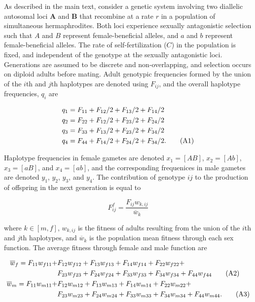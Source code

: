 \documentclass{article}
\newcommand\numberthis{\addtocounter{equation}{1}\tag{\theequation}}
\begin{document}
As described in the main text, consider a genetic system involving two diallelic autosomal loci $\mathbf{A}$ and $\mathbf{B}$ that recombine at a rate $r$ in a population of simultaneous hermaphrodites. Both loci experience sexually antagonistic selection such that $A$ and $B$ represent female-beneficial alleles, and $a$ and $b$ represent female-beneficial alleles. The rate of self-fertilization ($C$) in the population is fixed, and independent of the genotype at the sexually antagonistic loci. Generations are assumed to be discrete and non-overlapping, and selection occurs on diploid adults before mating. Adult genotypic frequencies formed by the union of the $i$th and $j$th haplotypes are denoted using $F_{ij}$, and the overall haplotype frequencies, $q_i$ are

\begin{align*}
	q_1 &= F_{11} + F_{12}/2 + F_{13}/2 + F_{14}/2 \\
	q_2 &= F_{22} + F_{12}/2 + F_{23}/2 + F_{24}/2 \\
	q_3 &= F_{33} + F_{13}/2 + F_{23}/2 + F_{34}/2 \\
	q_4 &= F_{44} + F_{14}/2 + F_{24}/2 + F_{34}/2. \numberthis \label{eqn}
\end{align*} 

Haplotype frequencies in female gametes are denoted $x_1 = [AB]$, $x_2 = [Ab]$, $x_3 = [aB]$, and $x_4 = [ab]$, and the corresponding frequenices in male gametes are denoted $y_1$, $y_2$, $y_3$, and $y_4$. The contribution of genotype $ij$ to the production of offspring in the next generation is equal to

\begin{equation}
	F^f_{ij} = \frac{F_{ij} w_{k,ij}}{\overline{w}_k}
\end{equation}

\noindent{} where $k \in [m,f]$, ${w}_{k,ij}$ is the fitness of adults resulting from the union of the $i$th and $j$th haplotypes, and $\overline{w}_k$ is the population mean fitness through each sex function. The average fitness through female and male function are 

\begin{align*}
	\overline{w}_f = F_{11} w_{f11} + &F_{12} w_{f12} + F_{13} w_{f13} + F_{14} w_{f14} + F_{22} w_{f22} + \\ 
				     &F_{23} w_{f23} + F_{24} w_{f24} + F_{33} w_{f33} + F_{34} w_{f34} + F_{44} w_{f44} \numberthis \\
	\overline{w}_m = F_{11} w_{m11} + &F_{12} w_{m12} + F_{13} w_{m13} + F_{14} w_{m14} + F_{22} w_{m22} + \\
				     &F_{23} w_{m23} + F_{24} w_{m24} + F_{33} w_{m33} + F_{34} w_{m34} + F_{44} w_{m44}. \numberthis
\end{align*}
\end{document}
